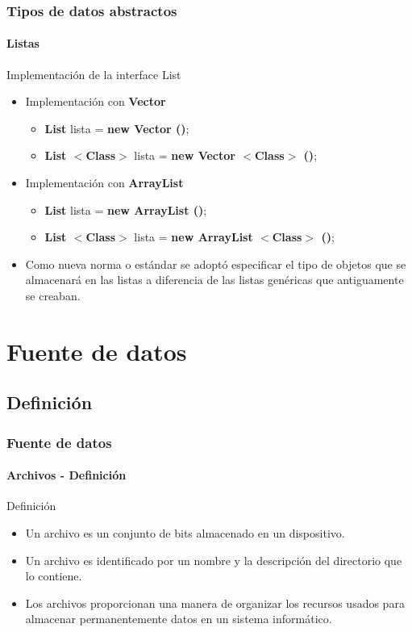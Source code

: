 \documentclass{beamer}
\begin{document}
		\begin{frame}
			\frametitle{Tipos de datos abstractos}
			\framesubtitle{Listas}

			\begin{block}{Implementaci\'on de la interface List}
				\begin{itemize}
					\item Implementaci\'on con \textbf{Vector} 
					\begin{itemize}
						\item \textbf{List} lista = \textbf{new Vector ()}; 
						\item \textbf{List $<$Class$>$} lista = \textbf{new Vector $<$Class$>$ ()}; 
					\end{itemize}
					\item Implementaci\'on con \textbf{ArrayList} 
					\begin{itemize}
						\item \textbf{List} lista = \textbf{new ArrayList ()}; 
						\item \textbf{List $<$Class$>$} lista = \textbf{new ArrayList $<$Class$>$ ()}; 
					\end{itemize}
					\item Como nueva norma o est\'andar se adopt\'o especificar el tipo de objetos que se almacenar\'a en las listas a diferencia de las listas gen\'ericas que antiguamente se creaban.
				\end{itemize}
			\end{block}
		\end{frame}    
    
    \section{Fuente de datos}

		\subsection{Definici\'on}

		\begin{frame}
			\frametitle{Fuente de datos}
			\framesubtitle{Archivos - Definici\'on}

			\begin{block}{Definici\'on}
				\begin{itemize}
					\item Un archivo es un conjunto de bits almacenado en un dispositivo.
					\item Un archivo es identificado por un nombre y la descripci\'on del directorio que lo contiene.
					\item Los archivos proporcionan una manera de organizar los recursos usados para almacenar permanentemente datos en un sistema inform\'atico.
				\end{itemize}
			\end{block}
		\end{frame}
\end{document}
